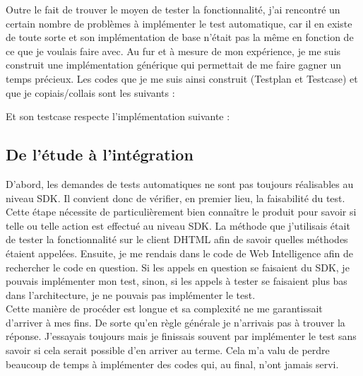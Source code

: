 Outre le fait de trouver le moyen de tester la fonctionnalit\'{e}, j'ai rencontr\'{e} un certain nombre de probl\`{e}mes \`{a} impl\'{e}menter le test automatique, car il en existe de toute sorte et son impl\'{e}mentation de base n'\'{e}tait pas la m\^{e}me en fonction de ce que je voulais faire avec. Au fur et \`{a} mesure de mon exp\'{e}rience, je me suis construit une impl\'{e}mentation g\'{e}n\'{e}rique qui permettait de me faire gagner un temps pr\'{e}cieux. Les codes que je me suis ainsi construit (\gls{Testplan} et \gls{Testcase}) et que je copiais/collais sont les suivants :




Et son testcase respecte l'impl\'{e}mentation suivante :







\subsection{De l'\'{e}tude \`{a} l'int\'{e}gration}

D'abord, les demandes de tests automatiques ne sont pas toujours r\'{e}alisables au niveau SDK. Il convient donc de v\'{e}rifier, en premier lieu, la faisabilit\'{e} du test. Cette \'{e}tape n\'{e}cessite de particuli\`{e}rement bien conna\^{i}tre le produit pour savoir si telle ou telle action est effectu\'{e} au niveau \gls{SDK}. La m\'{e}thode que j'utilisais \'{e}tait de tester la fonctionnalit\'{e} sur le client DHTML afin de savoir quelles m\'{e}thodes \'{e}taient appel\'{e}es. Ensuite, je me rendais dans le code de Web Intelligence afin de rechercher le code en question. Si les appels en question se faisaient du SDK, je pouvais impl\'{e}menter mon test, sinon, si les appels \`{a} tester se faisaient plus bas dans l'architecture, je ne pouvais pas impl\'{e}menter le test.\\
Cette mani\`{e}re de proc\'{e}der est longue et sa complexit\'{e} ne me garantissait d'arriver \`{a} mes fins. De sorte qu'en r\`{e}gle g\'{e}n\'{e}rale je n'arrivais pas \`{a} trouver la r\'{e}ponse. J'essayais toujours mais je finissais souvent par impl\'{e}menter le test sans savoir si cela serait possible d'en arriver au terme. Cela m'a valu de perdre beaucoup de temps \`{a} impl\'{e}menter des codes qui, au final, n'ont jamais servi.\\

